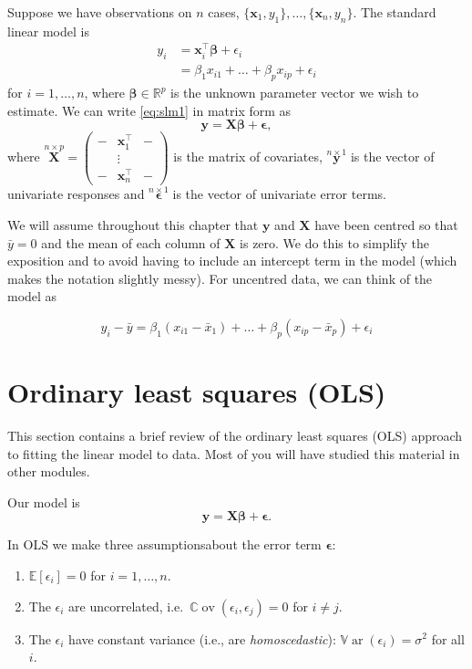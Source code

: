 \documentclass[
]{book}
\providecommand{\tightlist}{%
  \setlength{\itemsep}{0pt}\setlength{\parskip}{0pt}}
\theoremstyle{definition}
\theoremstyle{definition}
\theoremstyle{definition}
\theoremstyle{definition}
\theoremstyle{remark}
\begin{document}
Suppose we have observations on \(n\) cases, \(\{\mathbf x_1, y_1\}, \ldots, \{\mathbf x_n, y_n\}\). The standard linear model is
\begin{align}
y_i &= \mathbf x_i^\top \boldsymbol \beta+\epsilon_i
\label{eq:slm1}\\
&=\beta_1 x_{i1}+\ldots+\beta_p x_{ip}+\epsilon_i
\end{align}
for \(i=1, \ldots , n\),
where \(\boldsymbol \beta\in \mathbb{R}^p\) is the unknown parameter vector we wish to estimate. We can write \eqref{eq:slm1} in matrix form as
\begin{equation}
\mathbf y=\mathbf X\boldsymbol \beta+{\pmb \epsilon},
\label{eq:slm2}
\end{equation}
where \(\stackrel{n \times p}{\mathbf X}= \begin{pmatrix} - & \mathbf x_1^\top &-\\ &\vdots&\\ -&\mathbf x_n^\top&-\end{pmatrix}\) is the matrix of covariates,
\(\stackrel{n \times 1}{\mathbf y}\) is the vector of univariate responses and \(\stackrel{n \times 1}{\pmb \epsilon}\) is the vector of univariate error terms.

We will assume throughout this chapter that \(\mathbf y\) and \(\mathbf X\) have been centred so that \(\bar{y}=0\) and the mean of each column of \(\mathbf X\) is zero. We do this to simplify the exposition and to avoid having to include an intercept term in the model (which makes the notation slightly messy). For uncentred data, we can think of the model as

\[y_i - \bar{y} = \beta_1 (x_{i1}-\bar{x}_1)+\ldots+\beta_p (x_{ip}-\bar{x}_p)+\epsilon_i\]

\hypertarget{ordinary-least-squares-ols}{%
\section{Ordinary least squares (OLS)}\label{ordinary-least-squares-ols}}

This section contains a brief review of the ordinary least squares (OLS) approach to fitting the linear model to data. Most of you will have studied this material in other modules.

Our model is
\[
\mathbf y=\mathbf X\boldsymbol \beta+{\pmb \epsilon}.
\]

In OLS we make three assumptionsabout the error term \(\boldsymbol \epsilon\):

\begin{enumerate}
\def\labelenumi{\arabic{enumi}.}
\tightlist
\item
  \({\mathbb{E}}[\epsilon_i]=0\) for \(i=1, \ldots , n\).
\item
  The \(\epsilon_i\) are uncorrelated, i.e.~\({\mathbb{C}\operatorname{ov}}(\epsilon_i, \epsilon_j)=0\) for \(i \neq j\).
\item
  The \(\epsilon_i\) have constant variance (i.e., are \emph{homoscedastic}): \({\mathbb{V}\operatorname{ar}}(\epsilon_i)=\sigma^2\) for all \(i\).
\end{enumerate}
\end{document}

